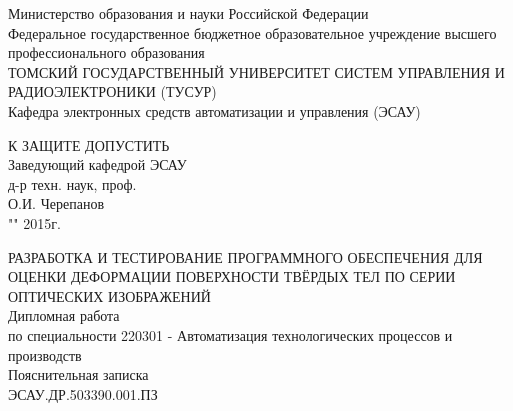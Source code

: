 \newpage
{}

\begin{center}
Министерство образования и науки Российской Федерации\\
Федеральное государственное бюджетное образовательное учреждение высшего профессионального образования\\
ТОМСКИЙ ГОСУДАРСТВЕННЫЙ УНИВЕРСИТЕТ СИСТЕМ УПРАВЛЕНИЯ И РАДИОЭЛЕКТРОНИКИ (ТУСУР)\\
Кафедра электронных средств автоматизации и управления (ЭСАУ)\\
\end{center}

\hfill
\begin{minipage}[right]{0.4\linewidth}
\begin{singlespace}
 К ЗАЩИТЕ ДОПУСТИТЬ \\
 Заведующий кафедрой ЭСАУ \\
 д-р техн. наук, проф.  \\
 \underline{\hspace{2.5cm}}О.И. Черепанов \\
 "\underline{\hspace{1cm}}"\underline{\hspace{3cm}} 2015г.\\
\end{singlespace} 
\end{minipage}


\begin{center}
РАЗРАБОТКА И ТЕСТИРОВАНИЕ ПРОГРАММНОГО ОБЕСПЕЧЕНИЯ ДЛЯ ОЦЕНКИ ДЕФОРМАЦИИ ПОВЕРХНОСТИ ТВЁРДЫХ ТЕЛ ПО СЕРИИ ОПТИЧЕСКИХ ИЗОБРАЖЕНИЙ \\
Дипломная работа \\
по специальности 220301 - Автоматизация технологических процессов и производств\\
Пояснительная записка \\
ЭСАУ.ДР.503390.001.ПЗ
\vspace{0.1cm}
\end{center}

